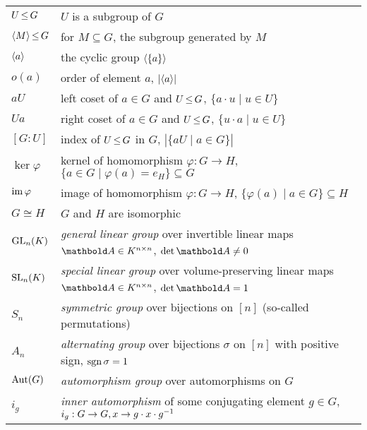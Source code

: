 \begin{fullwidth}
\section*{}
\begin{longtable}{p{2cm}l}
    $U \operatorname*{\leq} G$ & $U$ is a subgroup of $G$ \\
    $\langle M \rangle \operatorname*{\leq} G$ & for $M \subseteq G$, the subgroup generated by $M$ \\
    $\langle a \rangle$ & the cyclic group $\langle \{a\} \rangle$ \\
    $o(a)$ & order of element $a$, $|\langle a \rangle|$ \\
    $aU$ & left coset of $a \in G$ and $U \operatorname*{\leq} G$, $\{a \cdot u \mid u \in U\}$ \\
    $Ua$ & right coset of $a \in G$ and $U \operatorname*{\leq} G$, $\{u \cdot a \mid u \in U\}$ \\
    $[G:U]$ & index of $U \operatorname*{\leq} G$ in $G$, $|\{aU \mid a \in G\}|$ \\
    $\ker \varphi$ & kernel of homomorphism $\varphi : G \to H$, $\{a \in G \mid \varphi(a) = e_H\} \subseteq G$ \\
    $\operatorname*{im} \varphi$ & image of homomorphism $\varphi : G \to H$, $\{\varphi(a) \mid a \in G\} \subseteq H$ \\
    $G \cong H$ & $G$ and $H$ are isomorphic \\
    \addlinespace
    $\mathrm{GL}_{n}(K)$ & \emph{general linear group} over invertible linear maps $\mA \in K^{n \times n}$, $\det{\mA} \neq 0$ \\
    $\mathrm{SL}_{n}(K)$ & \emph{special linear group} over volume-preserving linear maps $\mA \in K^{n \times n}$, $\det{\mA} = 1$ \\
    $S_n$ & \emph{symmetric group} over bijections on $[n]$ (so-called permutations) \\
    $A_n$ & \emph{alternating group} over bijections $\sigma$ on $[n]$ with positive sign, $\operatorname*{sgn}{\sigma} = 1$ \\
    $\mathrm{Aut}(G)$ & \emph{automorphism group} over automorphisms on $G$ \\
    \addlinespace
    $i_g$ & \emph{inner automorphism} of some conjugating element $g \in G$, $i_g : G \to G, x \to g \cdot x \cdot g^{-1}$ \\
\end{longtable}
\end{fullwidth}
